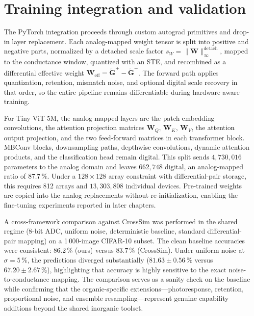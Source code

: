 \section{Training integration and validation}

The PyTorch integration proceeds through custom autograd primitives and drop-in layer replacement. Each analog-mapped weight tensor is split into positive and negative parts, normalized by a detached scale factor $s_W = \lVert \mathbf{W} \rVert_{\infty}^{\mathrm{detach}}$, mapped to the conductance window, quantized with an STE, and recombined as a differential effective weight $\mathbf{W}_{\text{eff}} = \widetilde{\mathbf{G}}^{+} - \widetilde{\mathbf{G}}^{-}$. The forward path applies quantization, retention, mismatch noise, and optional digital scale recovery in that order, so the entire pipeline remains differentiable during hardware-aware training.

For Tiny-ViT-5M, the analog-mapped layers are the patch-embedding convolutions, the attention projection matrices $\mathbf{W}_Q$, $\mathbf{W}_K$, $\mathbf{W}_V$, the attention output projection, and the two feed-forward matrices in each transformer block. MBConv blocks, downsampling paths, depthwise convolutions, dynamic attention products, and the classification head remain digital. This split sends $4{,}730{,}016$ parameters to the analog domain and leaves $662{,}748$ digital, an analog-mapped ratio of $87.7\,\%$. Under a $128 \times 128$ array constraint with differential-pair storage, this requires 812 arrays and $13{,}303{,}808$ individual devices. Pre-trained weights are copied into the analog replacements without re-initialization, enabling the fine-tuning experiments reported in later chapters.

A cross-framework comparison against CrossSim \citep{crosssim2026} was performed in the shared regime (8-bit ADC, uniform noise, deterministic baseline, standard differential-pair mapping) on a 1\,000-image CIFAR-10 subset. The clean baseline accuracies were consistent: $86.2\,\%$ (ours) versus $83.7\,\%$ (CrossSim). Under uniform noise at $\sigma=5\,\%$, the predictions diverged substantially ($81.63\pm0.56\,\%$ versus $67.20\pm2.67\,\%$), highlighting that accuracy is highly sensitive to the exact noise-to-conductance mapping. The comparison serves as a sanity check on the baseline while confirming that the organic-specific extensions---photoresponse, retention, proportional noise, and ensemble resampling---represent genuine capability additions beyond the shared inorganic toolset.

